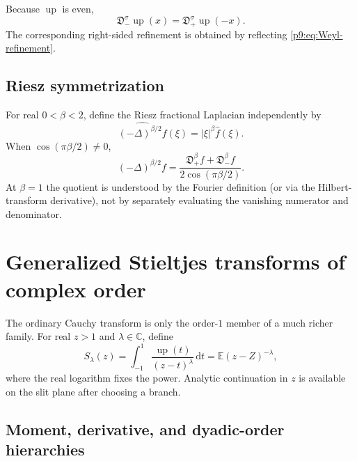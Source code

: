 \documentclass[11pt,oneside]{article}
\theoremstyle{definition}
\theoremstyle{remark}
\newcommand{\Up}{\operatorname{up}}
\newcommand{\E}{\mathbb E}
\newcommand{\C}{\mathbb C}
\newcommand{\dd}{\,\mathrm d}
\newcommand{\1}{\mathbf 1}
\begin{document}
\begin{corollary}
Because $\Up$ is even,
\begin{equation}
 \mathfrak D_-^\sigma\Up(x)
 =\mathfrak D_+^\sigma\Up(-x).
 \label{p9:eq:Weyl-reflection}
\end{equation}
The corresponding right-sided refinement is obtained by reflecting
\cref{p9:eq:Weyl-refinement}.
\end{corollary}

\subsection{Riesz symmetrization}

For real $0<\beta<2$, define the Riesz fractional Laplacian independently by
\begin{equation}
 \widehat{(-\Delta)^{\beta/2}f}(\xi)
 =|\xi|^\beta\widehat f(\xi).
 \label{p9:eq:Riesz-Fourier}
\end{equation}
When $\cos(\pi\beta/2)\ne0$,
\begin{equation}
 (-\Delta)^{\beta/2}f
 =\frac{\mathfrak D_+^\beta f+\mathfrak D_-^\beta f}
 {2\cos(\pi\beta/2)}.
 \label{p9:eq:Riesz-Weyl}
\end{equation}
At $\beta=1$ the quotient is understood by the Fourier definition (or via the
Hilbert-transform derivative), not by separately evaluating the vanishing
numerator and denominator.

\section{Generalized Stieltjes transforms of complex order}
\label{p9:sec:Stieltjes}

The ordinary Cauchy transform is only the order-$1$ member of a much richer
family.  For real $z>1$ and $\lambda\in\C$, define
\begin{equation}
 S_\lambda(z)
 =\int_{-1}^1\frac{\Up(t)}{(z-t)^\lambda}\dd t
 =\E(z-Z)^{-\lambda},
 \label{p9:eq:S-lambda}
\end{equation}
where the real logarithm fixes the power.  Analytic continuation in $z$ is
available on the slit plane after choosing a branch.

\subsection{Moment, derivative, and dyadic-order hierarchies}
\end{document}
